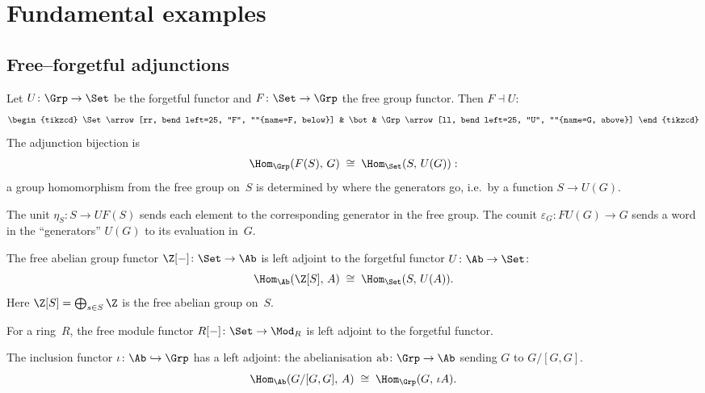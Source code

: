 \section{Fundamental examples}\label{sec:adj-examples}

\subsection{Free--forgetful adjunctions}

\begin{example}\label{ex:free-group}
Let $U\colon\Grp\to\Set$ be the forgetful functor and
$F\colon\Set\to\Grp$ the free group functor.
Then $F\dashv U$:
\[
\begin{tikzcd}
\Set
  \arrow[rr, bend left=25, "F", ""{name=F, below}]
& \bot &
\Grp
  \arrow[ll, bend left=25, "U", ""{name=G, above}]
\end{tikzcd}
\]
The adjunction bijection is
\[
    \Hom_\Grp(F(S),\,G) \;\cong\; \Hom_\Set(S,\,U(G)):
\]
a group homomorphism from the free group on~$S$ is determined by
where the generators go, i.e.\ by a function $S\to U(G)$.

The unit $\eta_S\colon S\to UF(S)$ sends each element to the
corresponding generator in the free group.
The counit $\varepsilon_G\colon FU(G)\to G$ sends a word in the
``generators'' $U(G)$ to its evaluation in~$G$.
\end{example}

\begin{example}\label{ex:free-abelian}
The free abelian group functor $\Z[-]\colon\Set\to\Ab$ is left adjoint
to the forgetful functor $U\colon\Ab\to\Set$:
\[
    \Hom_\Ab(\Z[S],\,A) \;\cong\; \Hom_\Set(S,\,U(A)).
\]
Here $\Z[S] = \bigoplus_{s\in S} \Z$ is the free abelian group on~$S$.
\end{example}

\begin{example}\label{ex:free-module}
For a ring~$R$, the free module functor $R[-]\colon\Set\to\Mod_R$
is left adjoint to the forgetful functor.
\end{example}

\begin{example}%
\label{ex:abelianisation}
The inclusion functor $\iota\colon\Ab\hookrightarrow\Grp$ has a
left adjoint: the abelianisation $\mathrm{ab}\colon\Grp\to\Ab$
sending $G$ to $G/[G,G]$.
\[
    \Hom_\Ab(G/[G,G],\,A) \;\cong\; \Hom_\Grp(G,\,\iota A).
\]
\end{example}

